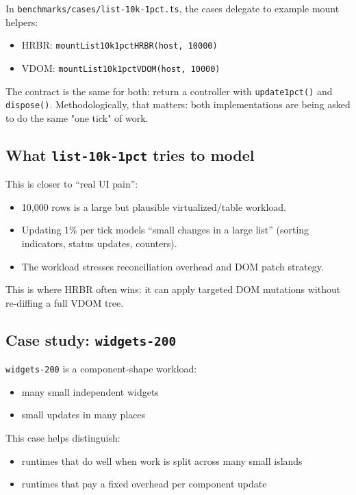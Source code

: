 In \texttt{benchmarks/cases/list-10k-1pct.ts}, the cases delegate to example mount helpers:

\begin{itemize}
\item HRBR: \texttt{mountList10k1pctHRBR(host, 10000)}
\item VDOM: \texttt{mountList10k1pctVDOM(host, 10000)}
\end{itemize}

The contract is the same for both: return a controller with \texttt{update1pct()} and \texttt{dispose()}.
Methodologically, that matters: both implementations are being asked to do the same "one tick" of work.

\subsection{What \texttt{list-10k-1pct} tries to model}

This is closer to ``real UI pain'':

\begin{itemize}
\item 10,000 rows is a large but plausible virtualized/table workload.
\item Updating 1\% per tick models ``small changes in a large list'' (sorting indicators, status updates, counters).
\item The workload stresses reconciliation overhead and DOM patch strategy.
\end{itemize}

This is where HRBR often wins: it can apply targeted DOM mutations without re-diffing a full VDOM tree.

\subsection{Case study: \texttt{widgets-200}}

	\texttt{widgets-200} is a component-shape workload:

\begin{itemize}
\item many small independent widgets
\item small updates in many places
\end{itemize}

This case helps distinguish:

\begin{itemize}
\item runtimes that do well when work is split across many small islands
\item runtimes that pay a fixed overhead per component update
\end{itemize}

